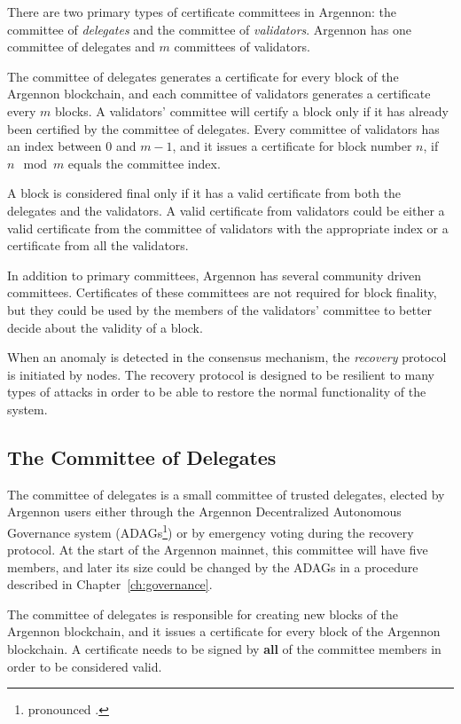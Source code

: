 
There are two primary types of certificate committees in Argennon: the committee of \emph{delegates} and the committee
of \emph{validators}. Argennon has one committee of delegates and $m$ committees of validators.

The committee of delegates generates a certificate for every block of the Argennon blockchain, and each
committee of validators generates a certificate every $m$ blocks. A validators' committee will
certify a block only if it has already been certified by the committee of delegates. Every committee of validators has
an index between $0$ and $m - 1$, and it issues a certificate for block number $n$, if $n\mod m$ equals
the committee index.

A block is considered final only if it has a valid certificate from both the delegates and the
validators. A valid certificate from validators could be either a valid certificate from the committee of
validators with the appropriate index or a certificate from all the validators.

In addition to primary committees, Argennon has several community driven committees. Certificates of these
committees are not required for block finality, but they could be used by the members of the
validators' committee to better decide about the validity of a block.

When an anomaly is detected in the consensus mechanism, the \emph{recovery} protocol is initiated by nodes. The
recovery protocol is designed to be resilient to many types of attacks in order to be able to restore the normal
functionality of the system.

\subsection{The Committee of Delegates}\label{subsec:the-committee-of-delegates}

The committee of delegates is a small committee of trusted delegates, elected by Argennon users either through the
Argennon Decentralized Autonomous Governance system (ADAGs\footnote{pronounced .}) or by emergency
voting during the recovery protocol. At the start of the Argennon mainnet, this committee will have
five members, and later its size could be changed by the ADAGs in a procedure described
in Chapter~\ref{ch:governance}.

The committee of delegates is responsible for creating new blocks of the Argennon blockchain, and it issues a
certificate for every block of the Argennon blockchain. A certificate needs to be signed
by \textbf{all} of the committee members in order to be considered valid.

